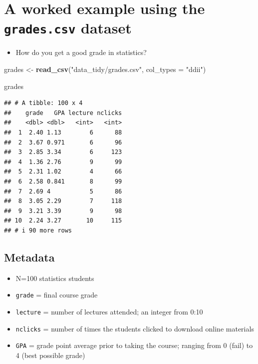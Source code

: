 \documentclass[
]{article}
\newenvironment{Shaded}{\begin{snugshade}}{\end{snugshade}}
\newcommand{\AttributeTok}[1]{\textcolor[rgb]{0.13,0.29,0.53}{#1}}
\newcommand{\FunctionTok}[1]{\textcolor[rgb]{0.13,0.29,0.53}{\textbf{#1}}}
\newcommand{\NormalTok}[1]{#1}
\newcommand{\OtherTok}[1]{\textcolor[rgb]{0.56,0.35,0.01}{#1}}
\newcommand{\StringTok}[1]{\textcolor[rgb]{0.31,0.60,0.02}{#1}}
\providecommand{\tightlist}{%
  \setlength{\itemsep}{0pt}\setlength{\parskip}{0pt}}
\begin{document}
\hypertarget{a-worked-example-using-the-grades.csv-dataset}{%
\section{\texorpdfstring{A worked example using the \texttt{grades.csv}
dataset}{A worked example using the grades.csv dataset}}\label{a-worked-example-using-the-grades.csv-dataset}}

\begin{itemize}
\tightlist
\item
  How do you get a good grade in statistics?
\end{itemize}

\begin{Shaded}
\begin{Highlighting}[]
\NormalTok{grades }\OtherTok{\textless{}{-}} 
  \FunctionTok{read\_csv}\NormalTok{(}\StringTok{"data\_tidy/grades.csv"}\NormalTok{, }
           \AttributeTok{col\_types =} \StringTok{"ddii"}\NormalTok{)}

\NormalTok{grades}
\end{Highlighting}
\end{Shaded}

\begin{verbatim}
## # A tibble: 100 x 4
##    grade   GPA lecture nclicks
##    <dbl> <dbl>   <int>   <int>
##  1  2.40 1.13        6      88
##  2  3.67 0.971       6      96
##  3  2.85 3.34        6     123
##  4  1.36 2.76        9      99
##  5  2.31 1.02        4      66
##  6  2.58 0.841       8      99
##  7  2.69 4           5      86
##  8  3.05 2.29        7     118
##  9  3.21 3.39        9      98
## 10  2.24 3.27       10     115
## # i 90 more rows
\end{verbatim}

\hypertarget{metadata}{%
\subsection{Metadata}\label{metadata}}

\begin{itemize}
\tightlist
\item
  N=100 statistics students
\item
  \texttt{grade} = final course grade
\item
  \texttt{lecture} = number of lectures attended; an integer from 0:10
\item
  \texttt{nclicks} = number of times the students clicked to download
  online materials
\item
  \texttt{GPA} = grade point average prior to taking the course; ranging
  from 0 (fail) to 4 (best possible grade)
\end{itemize}
\end{document}
